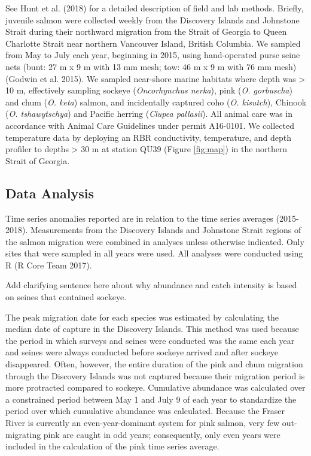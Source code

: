 \documentclass[fleqn,10pt]{wlpeerj} %
\begin{document}
See Hunt et al. (2018) for a detailed description of field and lab methods. Briefly, juvenile salmon were collected weekly from the Discovery Islands and Johnstone Strait during their northward migration from the Strait of Georgia to Queen Charlotte Strait near northern Vancouver Island, British Columbia. We sampled from May to July each year, beginning in 2015, using hand-operated purse seine nets (bunt: 27 m x 9 m with 13 mm mesh; tow: 46 m x 9 m with 76 mm mesh) (Godwin et al. 2015). We sampled near-shore marine habitats where depth was \textgreater{} 10 m, effectively sampling sockeye (\emph{Oncorhynchus nerka}), pink (\emph{O. gorbuscha}) and chum (\emph{O. keta}) salmon, and incidentally captured coho (\emph{O. kisutch}), Chinook (\emph{O. tshawytschya}) and Pacific herring (\emph{Clupea pallasii}). All animal care was in accordance with Animal Care Guidelines under permit A16-0101. We collected temperature data by deploying an RBR conductivity, temperature, and depth profiler to depths \textgreater{} 30 m at station QU39 (Figure \ref{fig:map}) in the northern Strait of Georgia.

\hypertarget{data-analysis}{%
\subsection{Data Analysis}\label{data-analysis}}

Time series anomalies reported are in relation to the time series averages (2015-2018). Measurements from the Discovery Islands and Johnstone Strait regions of the salmon migration were combined in analyses unless otherwise indicated. Only sites that were sampled in all years were used. All analyses were conducted using R (R Core Team 2017).

Add clarifying sentence here about why abundance and catch intensity is based on seines that contained sockeye.

The peak migration date for each species was estimated by calculating the median date of capture in the Discovery Islands. This method was used because the period in which surveys and seines were conducted was the same each year and seines were always conducted before sockeye arrived and after sockeye disappeared. Often, however, the entire duration of the pink and chum migration through the Discovery Islands was not captured because their migration period is more protracted compared to sockeye. Cumulative abundance was calculated over a constrained period between May 1 and July 9 of each year to standardize the period over which cumulative abundance was calculated. Because the Fraser River is currently an even-year-dominant system for pink salmon, very few out-migrating pink are caught in odd years; consequently, only even years were included in the calculation of the pink time series average.
\end{document}
